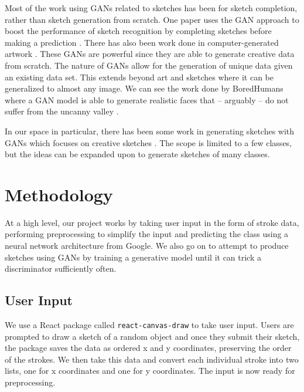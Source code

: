 \documentclass[10pt,twocolumn,letterpaper]{article}
\def\code#1{\texttt{#1}}
\begin{document}
Most of the work using GANs related to sketches has been for sketch completion, rather than sketch generation from scratch. One paper uses the GAN approach to boost the performance of sketch recognition by completing sketches before making a prediction \cite{liu2019sketchgan}. There has also been work done in computer-generated artwork \cite{mediumArticle}. These GANs are powerful since they are able to generate creative data from scratch. The nature of GANs allow for the generation of unique data given an existing data set. This extends beyond art and sketches where it can be generalized to almost any image. We can see the work done by BoredHumans where a GAN model is able to generate realistic faces that – arguably – do not suffer from the uncanny valley \cite{boredHumans}. 

In our space in particular, there has been some work in generating sketches with GANs which focuses on creative sketches \cite{ge2020creative}. The scope is limited to a few classes, but the ideas can be expanded upon to generate sketches of many classes.

\section{Methodology}

At a high level, our project works by taking user input in the form of stroke data, performing preprocessing to simplify the input and predicting the class using a neural network architecture from Google. We also go on to attempt to produce sketches using GANs by training a generative model until it can trick a discriminator sufficiently often.

\subsection{User Input}

We use a React package called \code{react-canvas-draw} \cite{react-canvas} to take user input. Users are prompted to draw a sketch of a random object and once they submit their sketch, the package saves the data as ordered x and y coordinates, preserving the order of the strokes. We then take this data and convert each individual stroke into two lists, one for x coordinates and one for y coordinates. The input is now ready for preprocessing.
\end{document}

